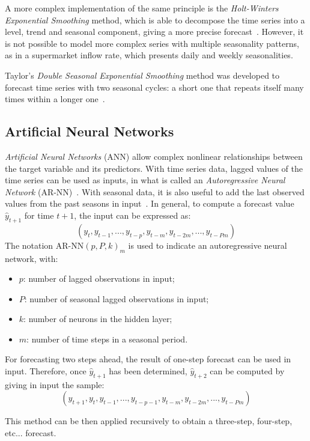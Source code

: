 A more complex implementation of the same principle is the \emph{Holt-Winters Exponential Smoothing} method, which is able to decompose the time series into a level, trend and seasonal component, giving a more precise forecast~\cite{holt}. However, it is not possible to model more complex series with multiple seasonality patterns, as in a supermarket inflow rate, which presents daily and weekly seasonalities.

Taylor’s \emph{Double Seasonal Exponential Smoothing} method was developed to forecast time series with two seasonal cycles: a short one that repeats itself many times within a longer one~\cite{taylor}.

\subsection{Artificial Neural Networks}
\label{subsec:artificial_neural_networks}

\emph{Artificial Neural Networks} (ANN) allow complex nonlinear relationships between the target variable and its predictors. With time series data, lagged values of the time series can be used as inputs, in what is called an \emph{Autoregressive Neural Network} (AR-NN)~\cite{tang}. With seasonal data, it is also useful to add the last observed values from the past seasons in input~\cite{hyndman2018}. In general, to compute a forecast value \( \hat{y}_{t+1} \) for time \( t+1 \), the input can be expressed as:
\[
  (y_{t}, y_{t-1}, ..., y_{t-p}, y_{t-m}, y_{t-2m}, ..., y_{t-Pm})
\]
The notation \( \text{AR-NN}(p, P, k)_m \) is used to indicate an autoregressive neural network, with:
\begin{itemize}
  \item \( p \): number of lagged observations in input;
  \item \( P \): number of seasonal lagged observations in input;
  \item \( k \): number of neurons in the hidden layer;
  \item \( m \): number of time steps in a seasonal period.
\end{itemize}

For forecasting two steps ahead, the result of one-step forecast can be used in input. Therefore, once \( \hat{y}_{t+1} \) has been determined, \( \hat{y}_{t+2} \) can be computed by giving in input the sample:
\[ (\hat{y}_{t+1}, y_{t}, y_{t-1}, ..., y_{t-p-1}, y_{t-m}, y_{t-2m}, ..., y_{t-Pm}) \]

This method can be then applied recursively to obtain a three-step, four-step, etc... forecast.

